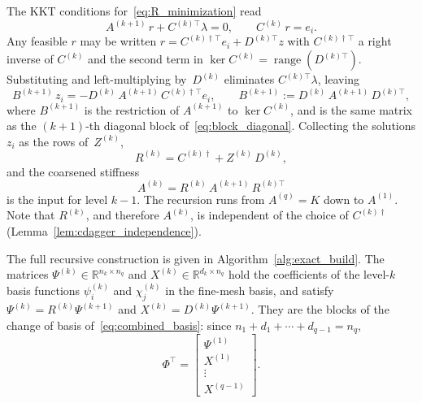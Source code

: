 The KKT conditions for~\eqref{eq:R_minimization} read
\begin{equation}\label{eq:kkt}
  A^{(k+1)}\,r + C^{(k)\top}\lambda = 0,
  \qquad C^{(k)}\,r = e_i .
\end{equation}
Any feasible $r$ may be written $r = C^{(k)\dagger\top} e_i + D^{(k)\top} z$
with $C^{(k)\dagger\top}$ a right inverse of $C^{(k)}$ and the second term in
$\ker C^{(k)} = \operatorname{range}(D^{(k)\top})$.  Substituting and
left-multiplying by~$D^{(k)}$ eliminates $C^{(k)\top}\lambda$, leaving
\begin{equation}\label{eq:z_solve}
  B^{(k+1)}\,z_i = -D^{(k)}\,A^{(k+1)}\,C^{(k)\dagger\top} e_i ,
  \qquad
  B^{(k+1)} := D^{(k)}\,A^{(k+1)}\,D^{(k)\top},
\end{equation}
where $B^{(k+1)}$ is the restriction of $A^{(k+1)}$ to $\ker C^{(k)}$, and is
the same matrix as the $(k+1)$-th diagonal block of~\eqref{eq:block_diagonal}.
Collecting the solutions $z_i$ as the rows of~$Z^{(k)}$,
\begin{equation}\label{eq:R_assembly}
  R^{(k)} = C^{(k)\dagger} + Z^{(k)}\,D^{(k)} ,
\end{equation}
and the coarsened stiffness
\begin{equation}\label{eq:coarsened_stiffness}
  A^{(k)} = R^{(k)}\,A^{(k+1)}\,R^{(k)\top}
\end{equation}
is the input for level $k-1$.  The recursion runs from $A^{(q)} = K$ down to
$A^{(1)}$.  Note that $R^{(k)}$, and therefore $A^{(k)}$, is independent of
the choice of $C^{(k)\dagger}$ (Lemma~\ref{lem:cdagger_independence}).

The full recursive construction is given in
Algorithm~\ref{alg:exact_build}.  The matrices
$\Psi^{(k)} \in \mathbb{R}^{n_k \times n_q}$ and $X^{(k)} \in
\mathbb{R}^{d_k \times n_q}$ hold the coefficients of the level-$k$ basis
functions $\psi^{(k)}_i$ and $\chi^{(k)}_j$ in the fine-mesh basis, and
satisfy $\Psi^{(k)} = R^{(k)}\Psi^{(k+1)}$ and $X^{(k)} =
D^{(k)}\Psi^{(k+1)}$.  They are the blocks of the change of basis
of~\eqref{eq:combined_basis}: since $n_1 + d_1 + \cdots + d_{q-1} = n_q$,
\begin{equation}\label{eq:Psi_blocks}
  \Phi^\top =
  \begin{bmatrix}
    \Psi^{(1)} \\ X^{(1)} \\ \vdots \\ X^{(q-1)}
  \end{bmatrix}.
\end{equation}

